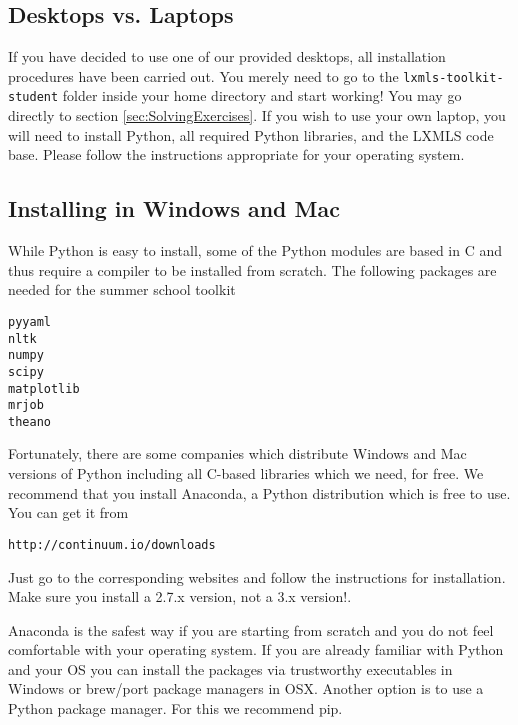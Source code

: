 \subsection{Desktops vs. Laptops}

If you have decided to use one of our provided desktops, all installation
procedures have been carried out. You merely need to go to the
\verb+lxmls-toolkit-student+ folder inside your home directory and start
working! You may go directly to section \ref{sec:SolvingExercises}.  If you
wish to use your own laptop, you will need to install Python, all
required Python libraries, and the LXMLS code base. Please follow the
instructions appropriate for your operating system.

\subsection{Installing in Windows and Mac}

While Python is easy to install, some of the Python modules are based in C and
thus require a compiler to be installed from scratch. The following packages
are needed for the summer school toolkit 

\begin{verbatim}
pyyaml
nltk
numpy
scipy
matplotlib
mrjob
theano 
\end{verbatim}

Fortunately, there are some companies which distribute Windows and Mac versions
of Python including all C-based libraries which we need, for free. We recommend
that you install Anaconda, a Python distribution which is free to use. You can
get it from 

\begin{verbatim}http://continuum.io/downloads\end{verbatim}

\noindent Just go to the corresponding websites and follow the instructions for
installation. Make sure you install a 2.7.x version, not a 3.x version!.

Anaconda is the safest way if you are starting from scratch and you do not
feel comfortable with your operating system. If you are already familiar with
Python and your OS you can install the packages via trustworthy executables 
in Windows or brew/port package managers in OSX. Another option is to use 
a Python package manager. For this we recommend pip.  

%

